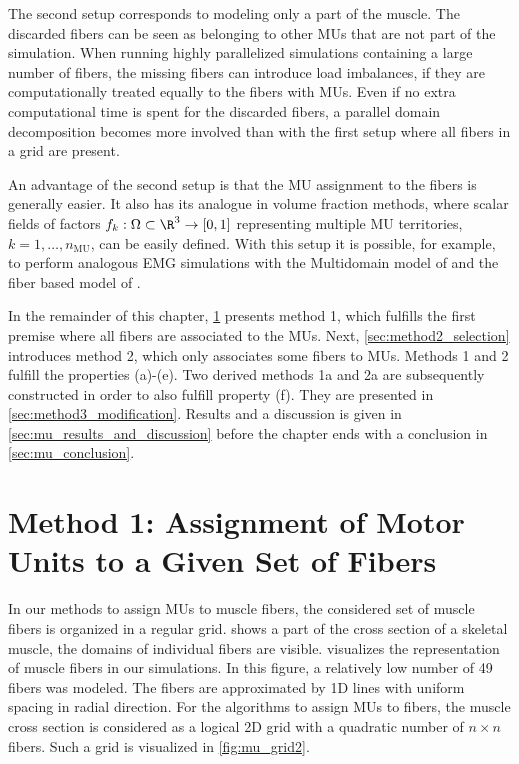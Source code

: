 The second setup corresponds to modeling only a part of the muscle. The discarded fibers can be seen as belonging to other MUs that are not part of the simulation. When running highly parallelized simulations containing a large number of fibers, the missing fibers can introduce load imbalances, if they are computationally treated equally to the fibers with MUs. Even if no extra computational time is spent for the discarded fibers, a parallel domain decomposition becomes more involved than with the first setup where all fibers in a grid are present.

An advantage of the second setup is that the MU assignment to the fibers is generally easier. It also has its analogue in volume fraction methods, where scalar fields of factors $f_k: \Omega \subset \R^3 \to [0,1]$ representing multiple MU territories, $k=1, \dots, n_\text{MU}$, can be easily defined. With this setup it is possible, for example, to perform analogous EMG simulations with the Multidomain model of \cite{Klotz2020} and the fiber based model of \cite{Mordhorst2015}.

In the remainder of this chapter, \cref{sec:method1_assignment} presents method 1, which fulfills the first premise where all fibers are associated to the MUs. Next, \cref{sec:method2_selection} introduces method 2, which only associates some fibers to MUs. Methods 1 and 2 fulfill the properties (a)-(e). Two derived methods 1a and 2a are subsequently constructed in order to also fulfill property (f). They are presented in \cref{sec:method3_modification}. Results and a discussion is given in \cref{sec:mu_results_and_discussion} before the chapter ends with a conclusion in \cref{sec:mu_conclusion}.

\section{Method 1: Assignment of Motor Units to a Given Set of Fibers}\label{sec:method1_assignment}

In our methods to assign MUs to muscle fibers, the considered set of muscle fibers is organized in a regular grid.  shows 
a part of the cross section of a skeletal muscle, the domains of individual fibers are visible.  visualizes the representation of muscle fibers in our simulations. In this figure, a relatively low number of 49 fibers was modeled. The fibers are approximated by 1D lines with uniform spacing in radial direction. For the algorithms to assign MUs to fibers, the muscle cross section is considered as a logical 2D grid with a quadratic number of $n \times n$ fibers. Such a grid is visualized in \cref{fig:mu_grid2}.

